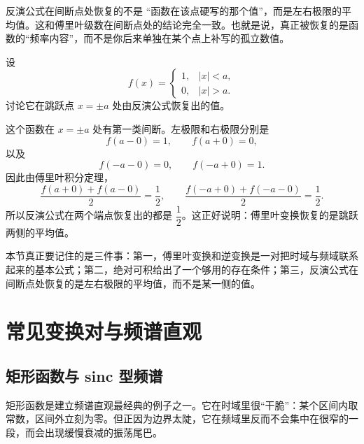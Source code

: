 \begin{jinshi}[这一节最容易忽略的一点]
反演公式在间断点处恢复的不是 ``函数在该点硬写的那个值''，而是左右极限的平均值。这和傅里叶级数在间断点处的结论完全一致。也就是说，真正被恢复的是函数的``频率内容''，而不是你后来单独在某个点上补写的孤立数值。
\end{jinshi}

\begin{lizi}{}{}
设
\begin{equation}
    f(x)=
    \begin{cases}
        1, & |x|<a, \\
        0, & |x|>a.
    \end{cases}
\end{equation}
讨论它在跳跃点 $x=\pm a$ 处由反演公式恢复出的值。

\begin{jie}
这个函数在 $x=\pm a$ 处有第一类间断。左极限和右极限分别是
\[
    f(a-0)=1,\qquad f(a+0)=0,
\]
以及
\[
    f(-a-0)=0,\qquad f(-a+0)=1.
\]
因此由傅里叶积分定理，
\begin{equation}
    \frac{f(a+0)+f(a-0)}{2}=\frac{1}{2},
    \qquad
    \frac{f(-a+0)+f(-a-0)}{2}=\frac{1}{2}.
\end{equation}
所以反演公式在两个端点恢复出的都是 $\dfrac{1}{2}$。这正好说明：傅里叶变换恢复的是跳跃两侧的平均值。
\end{jie}
\end{lizi}

\begin{tishi}[本节小结]
本节真正要记住的是三件事：第一，傅里叶变换和逆变换是一对把时域与频域联系起来的基本公式；第二，绝对可积给出了一个够用的存在条件；第三，反演公式在间断点处恢复的是左右极限的平均值，而不是某一侧的值。
\end{tishi}

\section{常见变换对与频谱直观}

\subsection{矩形函数与 sinc 型频谱}

矩形函数是建立频谱直观最经典的例子之一。它在时域里很``干脆''：某个区间内取常数，区间外立刻为零。但正因为边界太陡，它在频域里反而不会集中在很窄的一段，而会出现缓慢衰减的振荡尾巴。

